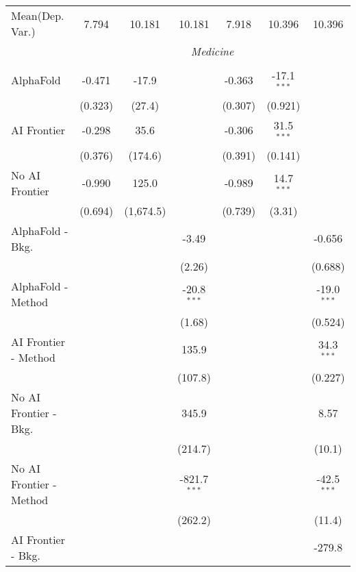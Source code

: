 \begin{tabular}{lcccccc}
Mean(Dep. Var.) & 7.794 & 10.181 & 10.181 & 7.918 & 10.396 & 10.396 \\
 & \multicolumn{6}{c}{\textit{Medicine}} \\ \\
   AlphaFold               & -0.471  & -17.9     &                & -0.363  & -17.1$^{***}$ &   \\   
                           & (0.323) & (27.4)    &                & (0.307) & (0.921)       &   \\   
   AI Frontier             & -0.298  & 35.6      &                & -0.306  & 31.5$^{***}$  &   \\   
                           & (0.376) & (174.6)   &                & (0.391) & (0.141)       &   \\   
   No AI Frontier          & -0.990  & 125.0     &                & -0.989  & 14.7$^{***}$  &   \\   
                           & (0.694) & (1,674.5) &                & (0.739) & (3.31)        &   \\   
   AlphaFold - Bkg.        &         &           & -3.49          &         &               & -0.656\\   
                           &         &           & (2.26)         &         &               & (0.688)\\   
   AlphaFold - Method      &         &           & -20.8$^{***}$  &         &               & -19.0$^{***}$\\   
                           &         &           & (1.68)         &         &               & (0.524)\\   
   AI Frontier - Method    &         &           & 135.9          &         &               & 34.3$^{***}$\\   
                           &         &           & (107.8)        &         &               & (0.227)\\   
   No AI Frontier - Bkg.   &         &           & 345.9          &         &               & 8.57\\   
                           &         &           & (214.7)        &         &               & (10.1)\\   
   No AI Frontier - Method &         &           & -821.7$^{***}$ &         &               & -42.5$^{***}$\\   
                           &         &           & (262.2)        &         &               & (11.4)\\   
   AI Frontier - Bkg.      &         &           &                &         &               & -279.8\\   

\end{tabular}
